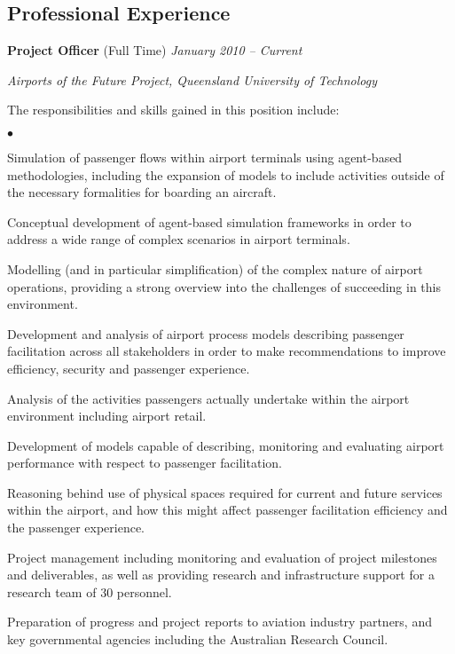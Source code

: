 \documentclass[margin,line]{resume}
\newenvironment{list1}{
  \begin{list}{}{%
      \setlength{\itemsep}{0in}
      \setlength{\parsep}{0in} \setlength{\parskip}{0in}
      \setlength{\topsep}{0in} \setlength{\partopsep}{0in}
      \setlength{\leftmargin}{0.17in}}}{\end{list}}
\newenvironment{list2}{
  \begin{list}{$\bullet$}{%
      \setlength{\itemsep}{0in}
      \setlength{\parsep}{0in} \setlength{\parskip}{0in}
      \setlength{\topsep}{0in} \setlength{\partopsep}{0in}
      \setlength{\leftmargin}{0.2in}}}{\end{list}}
\begin{document}
\begin{resume}
\section{\sc Professional Experience}
{\textbf{Project Officer} (Full Time)} \hfill {\it January 2010 -- Current}\\
\vspace{-0.85\baselineskip}
\begin{list1}
\item {\it Airports of the Future Project, Queensland University of Technology}
\item The responsibilities and skills gained in this position include:
\begin{list2}
\item Simulation of passenger flows within airport terminals using agent-based methodologies, including the expansion of models to include activities outside of the necessary formalities for boarding an aircraft.
\item Conceptual development of agent-based simulation frameworks in order to address a wide range of complex scenarios in airport terminals.
\item Modelling (and in particular simplification) of the complex nature of airport operations, providing a strong overview into the challenges of succeeding in this environment.
\item Development and analysis of airport process models describing passenger facilitation across all stakeholders in order to make recommendations to improve efficiency, security and passenger experience.
\item Analysis of the activities passengers actually undertake within the airport environment including airport retail.
\item Development of models capable of describing, monitoring and evaluating airport performance with respect to passenger facilitation.
\item Reasoning behind use of physical spaces required for current and future services within the airport, and how this might affect passenger facilitation efficiency and the passenger experience.
\item Project management including monitoring and evaluation of project milestones and deliverables, as well as providing research and infrastructure support for a research team of 30 personnel.
\item Preparation of progress and project reports to aviation industry partners, and key governmental agencies including the Australian Research Council.

\end{list2}
\end{list1}
\end{resume}
\end{document}
